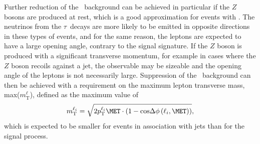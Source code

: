 Further reduction of the \Ztautau\ background can be achieved in particular if the $Z$ bosons are produced at rest, which is a good approximation for events with \ZeroJet. The neutrinos from the $\tau$~decays are more likely to be emitted in opposite directions in these types of events, and for the same reason, the leptons are expected to have a large opening angle, contrary to the signal signature.
If the $Z$ boson is produced with a significant transverse momentum, for example in cases where the $Z$ boson recoils against a jet, the \MET observable may be sizeable and the opening angle of the leptons is not necessarily large. 
Suppression of the \Ztautau\ background can then be achieved with a requirement on the maximum lepton transverse mass, max($m_{\text{T}}^\ell$), defined as the maximum value of 
\begin{equation}
    m_{\text{T}}^{\ell_i} = \sqrt{ 2 p_\text{T}^{\ell_i} \MET \cdot \left( 1 - \text{cos} \Delta \phi \left( \ell_i, \MET \right) \right) }, 
\end{equation}
which is expected to be smaller for \Ztautau events in association with jets than for the signal process.


